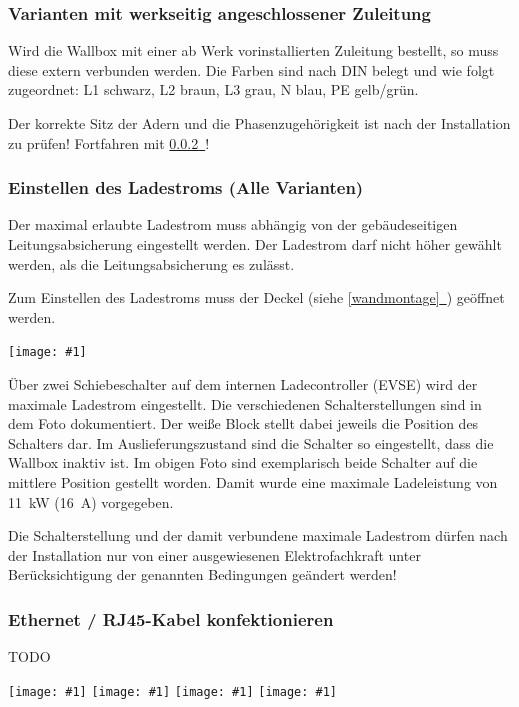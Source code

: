 \documentclass[a4paper,10pt]{article}
\newcommand{\hint}[1]{\begin{tcolorbox}[colback=boxgray,colframe=black,coltext=
white,title=Hinweis]#1\end{tcolorbox}}
\newcommand{\gfx}[1]{\texttt{[image: \#1]}}
\newcommand*{\fullref}[1]{\hyperref[{#1}]{\ref*{#1}~\nameref*{#1}}}
\begin{document}
\begin{multicols*}{2}
	\subsubsection{Varianten mit werkseitig angeschlossener Zuleitung}
	Wird die Wallbox mit einer ab Werk vorinstallierten Zuleitung bestellt, so
	muss diese extern verbunden werden. Die Farben sind nach DIN belegt und wie
	folgt zugeordnet: L1 schwarz, L2 braun, L3 grau, N blau, PE gelb/grün.
	
	Der korrekte Sitz der Adern und die Phasenzugehörigkeit ist nach der
	Installation zu prüfen! Fortfahren mit \fullref{ladestrom_schalter}!

	\subsubsection{Einstellen des Ladestroms (Alle Varianten)}\label{ladestrom_schalter}
	Der maximal erlaubte Ladestrom muss abhängig von der gebäudeseitigen
	Leitungsabsicherung eingestellt werden. Der Ladestrom darf nicht höher gewählt
	werden, als die Leitungsabsicherung es zulässt.

	Zum Einstellen des Ladestroms muss der Deckel (siehe \fullref{wandmontage})
	geöffnet werden. 

	\gfx{./img_warp2/resized/warp2_current_configure_w_caption_600}

	Über zwei Schiebeschalter auf dem internen Ladecontroller (EVSE) wird der
	maximale Ladestrom eingestellt. Die verschiedenen Schalterstellungen sind in
	dem Foto dokumentiert. Der weiße Block stellt dabei jeweils die Position
	des Schalters dar. Im Auslieferungszustand sind die Schalter so eingestellt,
	dass die Wallbox inaktiv ist. Im obigen Foto sind exemplarisch beide
	Schalter auf die mittlere Position gestellt worden. Damit wurde eine
	maximale Ladeleistung von \SI{11}{\kilo\watt} (\SI{16}{\ampere}) vorgegeben.
	\hint{Die Schalterstellung und der damit verbundene maximale Ladestrom dürfen nach der
		Installation nur von einer ausgewiesenen Elektrofachkraft unter
		Berücksichtigung der genannten Bedingungen geändert werden!}

	\subsubsection{Ethernet / RJ45-Kabel konfektionieren}\label{ethernet}

	TODO 

	\gfx{./img_warp2/resized/warp2_ethernet2_600}
	\gfx{./img_warp2/resized/warp2_ethernet3_600}
	\gfx{./img_warp2/resized/warp2_ethernet1_600}
	\gfx{./img_warp2/resized/warp2_ethernet4_600}


\end{multicols*}
\end{document}
